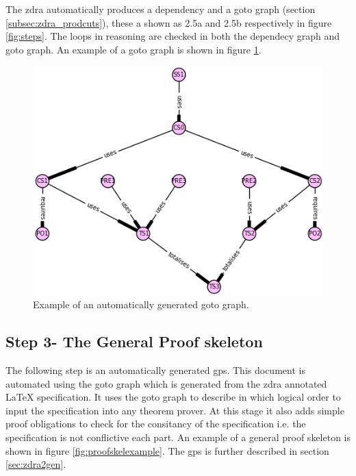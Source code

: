The \gls{zdra} automatically produces a dependency and a goto graph (section \ref{subsec:zdra_prodcuts}), these a shown as 2.5a and 2.5b respectively in figure \ref{fig:steps}. The loops in reasoning are checked in both the dependecy graph and goto graph. An example of a goto graph is shown in figure \ref{fig:gotoexamplee}.

\begin{figure}[H]
 \begin{center}
 \includegraphics [scale=0.4]{Figures/Design/goto.png}
 \caption{Example of an automatically generated goto graph.}
 \label{fig:gotoexamplee}
\end{center}
\end{figure} 

\subsection{Step 3- The General Proof skeleton}

The following step is an automatically generated \gls{gps}. This document is automated using the goto graph which is generated from the \gls{zdra} annotated \LaTeX{} specification. It uses the goto graph to describe in which logical order to input the specification into any theorem prover. At this stage it also adds simple proof obligations to check for the consitancy of the specification i.e. the specification is not conflictive each part. An example of a general proof skeleton is shown in figure \ref{fig:proofskelexample}. The \gls{gps} is further described in section \ref{sec:zdra2gen}.

